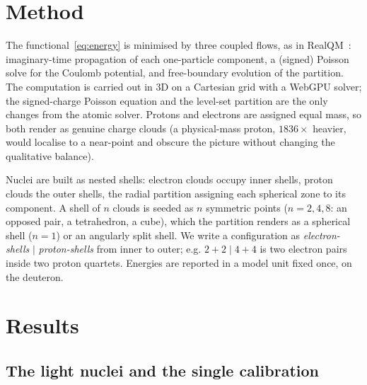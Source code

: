 \documentclass[11pt]{article}
\begin{document}
\section{Method}

The functional~\eqref{eq:energy} is minimised by three coupled flows, as in
RealQM~\cite{Johnson-RealQM}: imaginary-time propagation of each one-particle component,
a (signed) Poisson solve for the Coulomb potential, and free-boundary evolution of the
partition. The computation is carried out in 3D on a Cartesian grid with a WebGPU solver; the
signed-charge Poisson equation and the level-set partition are the only changes from the atomic
solver. Protons and electrons are assigned equal mass, so both render as genuine charge clouds
(a physical-mass proton, $1836\times$ heavier, would localise to a near-point and obscure the
picture without changing the qualitative balance).

Nuclei are built as nested shells: electron clouds occupy inner shells, proton clouds the outer
shells, the radial partition assigning each spherical zone to its component. A shell of $n$
clouds is seeded as $n$ symmetric points ($n=2,4,8$: an opposed pair, a tetrahedron, a cube),
which the partition renders as a spherical shell ($n=1$) or an angularly split shell. We write
a configuration as \emph{electron-shells} $\mid$ \emph{proton-shells} from inner to outer; e.g.
$2{+}2\mid 4{+}4$ is two electron pairs inside two proton quartets. Energies are reported in a
model unit fixed once, on the deuteron.

\section{Results}

\subsection{The light nuclei and the single calibration}
\end{document}
